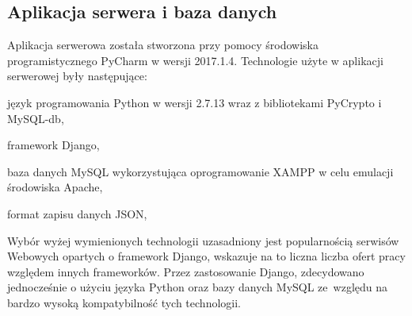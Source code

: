 \subsection{Aplikacja serwera i baza danych}
Aplikacja serwerowa została stworzona przy pomocy środowiska programistycznego PyCharm w wersji 2017.1.4. Technologie użyte w aplikacji serwerowej były następujące:
\begin{itemize*}
	\item język programowania Python w wersji 2.7.13 wraz z bibliotekami \linebreak PyCrypto i MySQL-db,
	\item framework Django,
	\item baza danych MySQL wykorzystująca oprogramowanie XAMPP w celu emulacji środowiska Apache,
	\item format zapisu danych JSON,
\end{itemize*}

Wybór wyżej wymienionych technologii uzasadniony jest popularnością serwisów Webowych opartych o framework Django, wskazuje na to liczna liczba ofert pracy względem innych frameworków. Przez zastosowanie Django, zdecydowano jednocześnie o użyciu języka Python oraz bazy danych MySQL ze~względu na bardzo wysoką kompatybilność tych technologii. 

